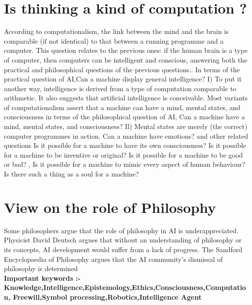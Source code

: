 \documentclass[a4paper,10pt]{article}
\begin{document}
\section{Is  thinking  a kind of computation ?}
According to computationalism, the link between the mind and the brain is comparable (if not identical) to that between a running programme and a computer. This question relates to the previous ones: if the human brain is a type of computer, then computers can be intelligent and conscious, answering both the practical and philosophical questions of the previous questions.. In terms of the practical question of AI,Can a machine display general intelligence?
I) To put it another way, intelligence is derived from a type of computation comparable to arithmetic. It also suggests that artificial intelligence is conceivable. Most variants of computationalism assert that a machine can have a mind, mental states, and consciousness in terms of the philosophical question of AI, Can a machine have a mind, mental states, and consciousness?
Il) Mental states are merely (the correct) computer programmes in action.
Can a machine have emotions? and other related questions Is it possible for a machine to have its own consciousness? Is it possible for a machine to be inventive or original? Is it possible for a machine to be good or bad? , Is it possible for a machine to mimic every aspect of human behaviour? Is there such a thing as a soul for a machine?
\section {View on the role of Philosophy}
Some philosophers argue that the role of philosophy in AI is underappreciated.
Physicist David Deutsch argues that without an understanding of philosophy
or its concepts, AI development would suffer from a lack of progress. The
Sandford Encyclopaedia of Philosophy argues that the AI community’s dismissal
of philosophy is determined\\


\textbf{Important keywords :- Knowledge,Intelligence,Epistemology,Ethics,Consciousness,Computation,
Freewill,Symbol processing,Robotics,Intelligence Agent }
\end{document}
